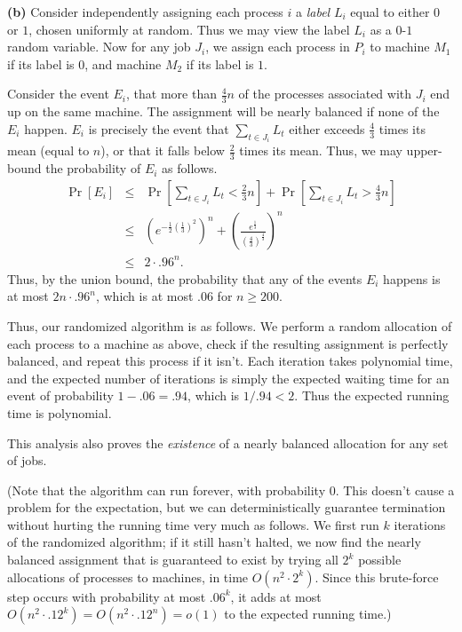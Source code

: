 \documentclass[12pt]{article}
\begin{document}
\begin{enumerate}
{%


{\bf (b)} Consider independently
assigning each process $i$ a {\em label} $L_i$
equal to either $0$ or $1$, chosen uniformly at random.
Thus we may view the label $L_i$ as a $0$-$1$ random variable.
Now for any job $J_i$, we assign each process in $P_i$
to machine $M_1$ if its label is $0$,
and machine $M_2$ if its label is $1$.

Consider the event $E_i$,
that more than $\frac43 n$ of the processes
associated with $J_i$ end up on the same machine.
The assignment will be nearly balanced if none of the $E_i$ happen.
$E_i$ is precisely the event that
$\sum_{t \in J_i} L_t$ either exceeds $\frac43$ times
its mean (equal to $n$), or that it falls below $\frac23$
times its mean.
Thus, we may upper-bound the probability of $E_i$ as follows.
\begin{eqnarray*}
\Pr[E_i] & \leq & \Pr[\sum_{t \in J_i} L_t < \frac23 n]
+ \Pr[\sum_{t \in J_i} L_t > \frac43 n] \\
& \leq & \left(e^{-\frac12 (\frac13)^2}\right)^n +
\left(\frac{e^{\frac13}}{\left(\frac43\right)^{\frac43}}\right)^n \\
& \leq & 2 \cdot .96^n.
\end{eqnarray*}
Thus, by the union bound, the probability that
any of the events $E_i$ happens is at most
$2 n \cdot .96^n$, which is
at most $.06$ for $n \geq 200$.

Thus, our randomized algorithm is as follows.
We perform a random allocation of each process to a machine as above,
check if the resulting assignment is perfectly balanced,
and repeat this process if it isn't.
Each iteration takes polynomial time,
and the expected number of iterations is simply the expected waiting
time for an event of probability $1 - .06 = .94$,
which is $1 / .94 < 2$.
Thus the expected running time is polynomial.

This analysis also proves the {\em existence} of a nearly
balanced allocation for any set of jobs.

(Note that the algorithm can run forever, with probability $0$.
This doesn't cause a problem for the expectation,
but we can deterministically guarantee termination without
hurting the running time very much as follows.
We first run $k$ iterations of the randomized algorithm;
if it still hasn't halted, we now find the
nearly balanced assignment that is guaranteed to exist
by trying all $2^k$ possible
allocations of processes to machines, in time
$O(n^2 \cdot 2^k)$.
Since this brute-force step occurs with probability
at most $.06^k$, it adds at most
$O(n^2 \cdot .12^k) = O(n^2 \cdot .12^n) = o(1)$
to the expected running time.)

}
\end{enumerate}
\end{document}
